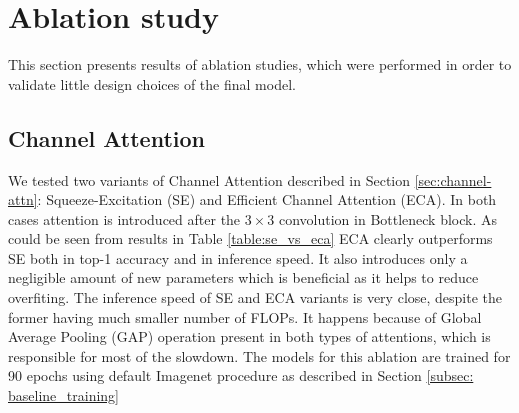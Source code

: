 \section{Ablation study} \label{sec:ablation}

This section presents results of ablation studies, which were performed in order to validate little design choices of the final model. 

\subsection{Channel Attention}
We tested two variants of Channel Attention described in Section \ref{sec:channel-attn}: Squeeze-Excitation (SE) and Efficient Channel Attention (ECA). In both cases attention is introduced after the $3 \times 3$ convolution in Bottleneck block. As could be seen from results in Table \ref{table:se_vs_eca} ECA clearly outperforms SE both in top-1 accuracy and in inference speed. It also introduces only a negligible amount of new parameters which is beneficial as it helps to reduce overfiting. The inference speed of SE and ECA variants is very close, despite the former having much smaller number of FLOPs. It happens because of Global Average Pooling (GAP) operation present in both types of attentions, which is responsible for most of the slowdown. The models for this ablation are trained for 90 epochs using default Imagenet procedure as described in Section \ref{subsec: baseline_training}





